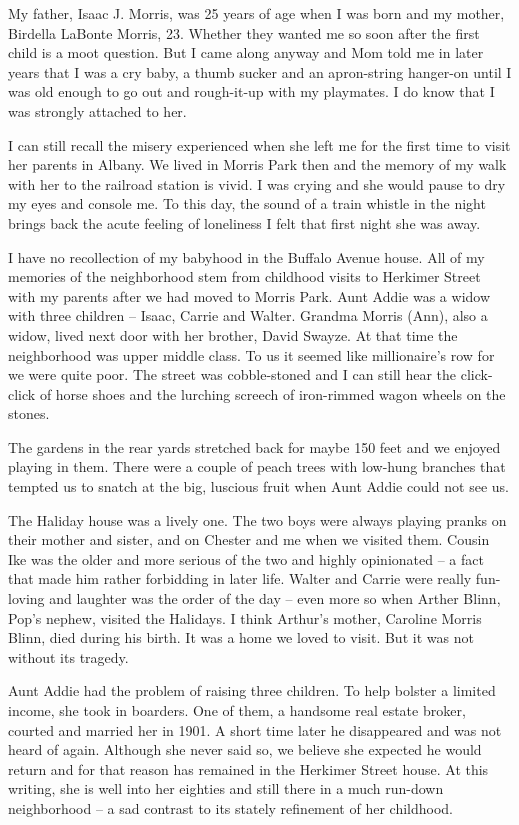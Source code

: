 \documentclass[12pt]{book}              %
\begin{document}
My father, Isaac J. Morris, was 25 years of age when I was born and my mother, Birdella LaBonte Morris, 23. Whether they wanted me so soon after the first child is a moot question. But I came along anyway and Mom told me in later years that I was a cry baby, a thumb sucker and an apron-string hanger-on until I was old enough to go out and rough-it-up with my playmates. I do know that I was strongly attached to her. 

I can still recall the misery experienced when she left me for the first time to visit her parents in Albany. We lived in Morris Park then and the memory of my walk with her to the railroad station is vivid. I was crying and she would pause to dry my eyes and console me. To this day, the sound of a train whistle in the night brings back the acute feeling of loneliness I felt that first night she was away. 

I have no recollection of my babyhood in the Buffalo Avenue house. All of my memories of the neighborhood stem from childhood visits to Herkimer Street with my parents after we had moved to Morris Park. Aunt Addie was a widow with three children -- Isaac, Carrie and Walter. Grandma Morris (Ann), also a widow, lived next door with her brother, David Swayze. At that time the neighborhood was upper middle class. To us it seemed like millionaire's row for we were quite poor. The street was cobble-stoned and I can still hear the click-click of horse shoes and the lurching screech of iron-rimmed wagon wheels on the stones. 

The gardens in the rear yards stretched back for maybe 150 feet and we enjoyed playing in them. There were a couple of peach trees with low-hung branches that tempted us to snatch at the big, luscious fruit when Aunt Addie could not see us. 

The Haliday house was a lively one. The two boys were always playing pranks on their mother and sister, and on Chester and me when we visited them. Cousin Ike was the older and more serious of the two and highly opinionated -- a fact that made him rather forbidding in later life. Walter and Carrie were really fun-loving and laughter was the order of the day -- even more so when Arther Blinn, Pop's nephew, visited the Halidays. I think Arthur's mother, Caroline Morris Blinn, died during his birth. It was a home we loved to visit. But it was not without its tragedy. 

Aunt Addie had the problem of raising three children. To help bolster a limited income, she took in boarders. One of them, a handsome real estate broker, courted and married her in 1901. A short time later he disappeared and was not heard of again. Although she never said so, we believe she expected he would return and for that reason has remained in the Herkimer Street house. At this writing, she is well into her eighties and still there in a much run-down neighborhood -- a sad contrast to its stately refinement of her childhood. 
\end{document}
